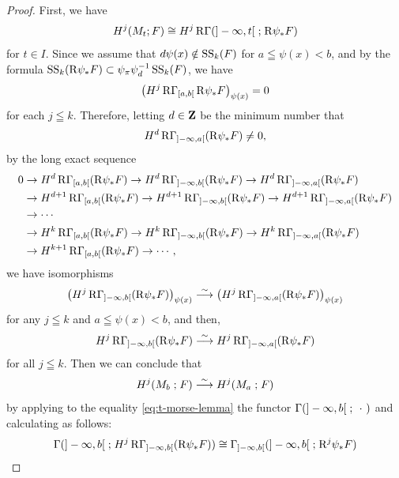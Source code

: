 \begin{proof}
  First, we have\[
    H^{j}(M_{t};F)
    \cong
    H^{j}\RG({]-\infty,t[}\mathrel{;}\Rder{\psi}_{\ast}F)
  \]
  for \(t\in I\).
  Since we assume that \(d\psi(x)\notin \muS[k](F)\) 
  for \(a\leqq \psi(x)<b\), and by the formula \(\muS[k](\Rder{\psi}_{\ast}F)
    \subset \mpb[\psi]\mdiff[\psi]^{-1}\muS[k](F)
  \), we have\[
    \left(H^{j}\RG_{[a,b[}\Rder{\psi}_{\ast}F\right)_{\psi(x)}=0
  \]for each \(j\leqq k\). 
  Therefore, letting \(d\in\zz\) be the minimum number 
  that \[H^{d}\RG_{]-\infty,a[}(\Rder{\psi}_{\ast}F)\ne0,\] 
  by the long exact sequence
  \begin{align*}
    0&\to 
    H^{d}\RG_{[a,b[}(\Rder{\psi}_{\ast}F)
    \to
    H^{d}\RG_{]-\infty,b[}(\Rder{\psi}_{\ast}F)
    \to
    H^{d}\RG_{]-\infty,a[}(\Rder{\psi}_{\ast}F)\\
    &\to 
    H^{d+1}\RG_{[a,b[}(\Rder{\psi}_{\ast}F)
    \to
    H^{d+1}\RG_{]-\infty,b[}(\Rder{\psi}_{\ast}F)
    \to
    H^{d+1}\RG_{]-\infty,a[}(\Rder{\psi}_{\ast}F)\\
    &\to\cdots\\
    &\to 
    H^{k}\RG_{[a,b[}(\Rder{\psi}_{\ast}F)
    \to
    H^{k}\RG_{]-\infty,b[}(\Rder{\psi}_{\ast}F)
    \to
    H^{k}\RG_{]-\infty,a[}(\Rder{\psi}_{\ast}F)\\
    &\to
    H^{k+1}\RG_{[a,b[}(\Rder{\psi}_{\ast}F)\to\cdots,
  \end{align*} 
  we have isomorphisms
  \begin{equation*}%
    \left(H^{j}\RG_{]-\infty,b[}(\Rder{\psi}_{\ast}F)\right)_{\psi(x)}
    \simarr
    \left(H^{j}\RG_{]-\infty,a[}(\Rder{\psi}_{\ast}F)\right)_{\psi(x)}
  \end{equation*}
  for any \(j\leqq k\) and \(a\leqq \psi(x) < b\), 
  and then, 
  \begin{equation}\label{eq:t-morse-lemma}
    H^{j}\RG_{]-\infty,b[}(\Rder{\psi}_{\ast}F)
    \simarr
    H^{j}\RG_{]-\infty,a[}(\Rder{\psi}_{\ast}F)
  \end{equation}
  for all \(j\leqq k\). Then we can conclude that
  \[
    H^{j}(M_b\mathrel{;}F)
    \simarr
    H^{j}(M_a\mathrel{;}F)
  \]
  by applying to the equality \eqref{eq:t-morse-lemma} 
  the functor \(
    \Gamma({]-\infty,b[}\mathrel{;}\blk)
  \) and calculating as follows:
  \begin{align*}
    \Gamma({]-\infty,b[}\mathrel{;}H^{j}\RG_{]-\infty,b[}(\Rder{\psi}_{\ast}F))
    &\cong
    \Gamma_{]-\infty,b[}({]-\infty,b[}\mathrel{;}\Rder^{j}{\psi}_{\ast}F)\\

\end{align*}
\end{proof}
